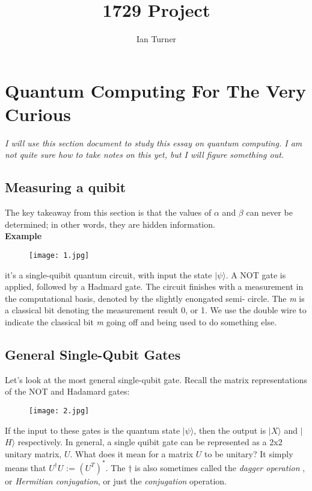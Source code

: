\documentclass{article}
\title{1729 Project}
\author{Ian Turner}
\begin{document}
\maketitle
\section*{Quantum Computing For The Very Curious}
\textit{I will use this section document to study this essay on quantum
computing. I am not quite sure how to take notes on this yet, but I will
figure something out.}

\subsection*{Measuring a quibit}
The key takeaway from this section is that the values of $\alpha$ and $\beta$ can never
be determined; in other words, they are hidden information.\\
\textbf{Example}

\begin{figure}[h]
    \texttt{[image: 1.jpg]}
    \centering
\end{figure}

it's a single-quibit quantum circuit, with input the state $|$$\psi$$\rangle$.
A NOT gate is applied, followed by a Hadmard gate. The circuit finishes with a
measurement in the computational basis, denoted by the slightly enongated semi-
circle. The \textit{m} is a classical bit denoting the measurement result 0, or
1. We use the double wire to indicate the classical bit \textit{m} going off
and being used to do something else.

\subsection*{General Single-Qubit Gates}
Let's look at the most general single-qubit gate. Recall the matrix
representations of the NOT and Hadamard gates:

\begin{figure}[h]
    \texttt{[image: 2.jpg]}
    \centering
\end{figure}

If the input to these gates is the quantum state $|$$\psi$$\rangle$, then
the output is $|$$X$$\rangle$ and  $|$$H$$\rangle$ respectively. In general,
a single quibit gate can be represented as a 2x2 unitary matrix, $U$. What does
it mean for a matrix $U$ to be unitary? It simply means that $U^\dagger U$ :=
$(U^T)^*$. The $\dagger$ is also sometimes called the \textit{dagger operation}
, or \textit{Hermitian conjugation}, or just the \textit{conjugation} operation.
\end{document}
